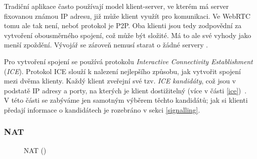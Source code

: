 Tradiční aplikace často používají model klient-server, ve kterém má server
fixovanou známou IP adresu, již může klient využít pro komunikaci. Ve WebRTC
tomu ale tak není, neboť protokol je P2P. Oba klienti jsou tedy zodpovědní za
vytvoření obousměrného spojení, což může být složité. Má to ale své vyhody jako
menší zpoždění. Vývojář se zároveň nemusí starat o žádné servery
\cite{WebRTCForTheCurious}.

Pro vytvoření spojení se používá protokolu \textit{Interactive Connectivity
Establishment} (\textit{ICE}). Protokol ICE slouží k nalezení nejlepšího
způsobu, jak vytvořit spojení mezi dvěma klienty. Každý klient zveřejní své tzv.
\textit{ICE kandidáty}, což jsou v podstatě IP adresy a porty, na kterých je
klient dostižitelný (více v části \ref{ice})~\cite{WebRTCForTheCurious}. V této
části se zabýváme jen samotným výběrem těchto kandidátů; jak si klienti předají
informace o kandidátech je rozebráno v sekci \ref{signalling}.

\subsubsection{NAT}\label{nat}

\begin{figure}[H]
	\centering
	\caption{NAT (\publicPrivateIP)}
	\label{natFig}
\end{figure}

